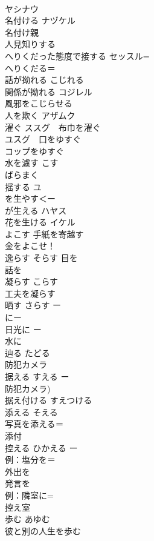 \documentclass[8pt]{extreport}
\begin{document}
\begin{CJK}{UTF8}{min}
\\	ヤシナウ
\\	名付ける	ナヅケル 
\\	名付け親	
\\	人見知りする	
\\	へりくだった態度で接する	セッスル=
\\	へりくだる＝
\\	話が拗れる	こじれる 
\\	関係が拗れる	コジレル 
\\	風邪をこじらせる	
\\	人を欺く	アザムク 
\\	濯ぐ	ススグ　布巾を濯ぐ 
\\	ユスグ　口をゆすぐ 
\\	コップをゆすぐ 
\\	水を濾す	こす 
\\	ばらまく	
\\	揺する	ユ 
\\	を生やす＜ー
\\	が生える	ハヤス 
\\	花を生ける	イケル 
\\	よこす	手紙を寄越す 
\\	金をよこせ！ 
\\	逸らす	そらす 目を 
\\	話を 
\\	凝らす	こらす 
\\	工夫を凝らす 
\\	晒す	さらす ー
\\	にー
\\	日光に ー
\\	水に 
\\	辿る	たどる 
\\	防犯カメラ	
\\	据える	すえる ー
\\	防犯カメラ)
\\	据え付ける	すえつける 
\\	添える	そえる 
\\	写真を添える＝
\\	添付 
\\	控える	ひかえる ー
\\	例：塩分を＝
\\	外出を 
\\	発言を 
\\	例：隣室に=
\\	控え室 
\\	歩む	あゆむ 
\\	彼と別の人生を歩む 

\end{CJK}
\end{document}
